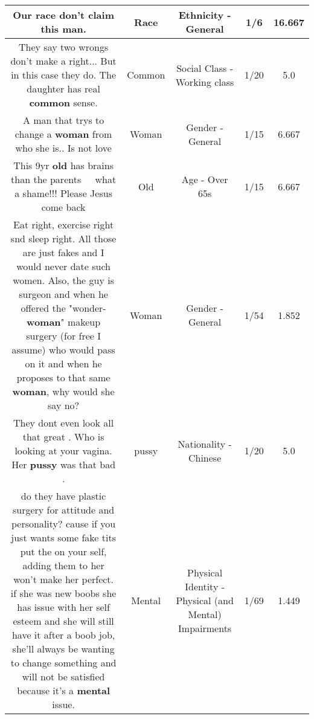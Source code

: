 \documentclass[11pt]{article}
\newlength\mylength
\begin{document}
\begin{center}
\begin{longtable}{|C{.65\mylength}|C{.30\mylength}|C{.12\mylength}|C{.12\mylength}|C{.12\mylength}|}
  \small Our \textbf{race} don't claim this man.\normalsize   & Race & Ethnicity - General & 1/6 & 16.667 \\  \hline
  \small They say two wrongs don't make a right... But in this case they do. The daughter has real \textbf{common} sense.\normalsize   & Common & Social Class - Working class & 1/20 & 5.0 \\  \hline
  \small A man that trys to change a \textbf{woman} from who she is.. Is not love\normalsize   & Woman & Gender - General & 1/15 & 6.667 \\  \hline
  \small This 9yr \textbf{old} has brains than the parents🙊🙊🙊🙊 what a shame!!! Please Jesus come back\normalsize   & Old & Age - Over 65s & 1/15 & 6.667 \\  \hline
  \small Eat right, exercise right snd sleep right. All those are just fakes and I would never date such women.  Also, the guy is surgeon and when he offered the "wonder-\textbf{woman}" makeup surgery (for free I assume) who would pass on it and when he proposes to that same \textbf{woman}, why would she say no?\normalsize   & Woman & Gender - General & 1/54 & 1.852 \\  \hline
  \small They dont even look all that great . Who is looking at your vagina.  Her \textbf{pussy} was that bad .\normalsize   & pussy & Nationality - Chinese & 1/20 & 5.0 \\  \hline
  \small do they have plastic surgery for attitude and personality? cause if you just wants some fake tits put the on your self, adding them to her won't make her perfect. if she was new boobs she has issue with her self esteem  and she will still have it after a boob job, she'll always be wanting to change something and will not be satisfied  because it's a \textbf{mental} issue.\normalsize   & Mental & Physical Identity - Physical (and Mental) Impairments & 1/69 & 1.449 \\  \hline

\end{longtable}
\end{center}
\end{document}
